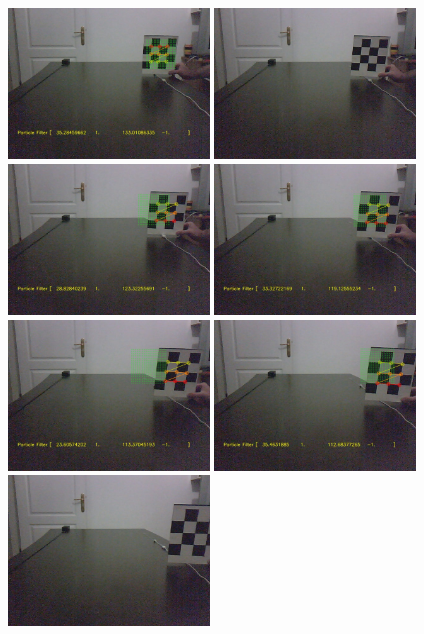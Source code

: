 \documentclass[12pt,fleqn]{article}\usepackage{../common}
\begin{document}
\includegraphics[height=4cm]{cb-pf-5.jpg}
\includegraphics[height=4cm]{cb-pf-6.jpg}
\includegraphics[height=4cm]{cb-pf-7.jpg}
\includegraphics[height=4cm]{cb-pf-8.jpg}
\includegraphics[height=4cm]{cb-pf-9.jpg}
\includegraphics[height=4cm]{cb-pf-10.jpg}
\includegraphics[height=4cm]{cb-pf-11.jpg}
\end{document}
